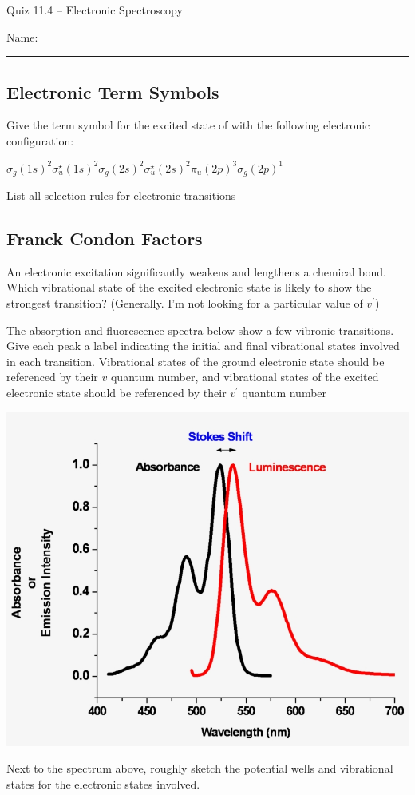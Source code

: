 \documentclass[11pt, letterpaper]{memoir}
\begin{document}
\begin{center}
	{\large Quiz 11.4 -- Electronic Spectroscopy}
\end{center}
{\large Name: \rule[-1mm]{4in}{.1pt}

\subsection*{Electronic Term Symbols}
Give the term symbol for the excited state of  with the following electronic configuration:

\noindent
$\sigma_g(1s)^2\sigma_u^\star(1s)^2\sigma_g(2s)^2\sigma_u^\star(2s)^2\pi_u(2p)^3\sigma_g(2p)^1$


\vspace{2em}\noindent
List all selection rules for electronic transitions

\vspace{3em}
\subsection*{Franck Condon Factors}
An electronic excitation significantly weakens and lengthens a chemical bond. Which vibrational state of the excited electronic state is likely to show the strongest transition? (Generally. I'm not looking for a particular value of $v^\prime$)

\vspace{3em}\noindent
The absorption and fluorescence spectra below show a few vibronic transitions. Give each peak a label indicating the initial and final vibrational states involved in each transition. Vibrational states of the ground electronic state should be referenced by their $v$ quantum number, and vibrational states of the excited electronic state should be referenced by their $v^\prime$ quantum number

\noindent
\includegraphics[width=0.5\linewidth]{Fluorescence}

\noindent
Next to the spectrum above, roughly sketch the potential wells and vibrational states for the electronic states involved.

}
\end{document}
